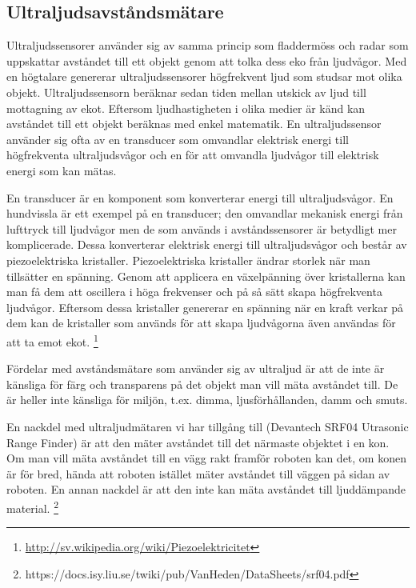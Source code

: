 \documentclass[a4paper,12pt,fleqn]{article}
\begin{document}
\subsection{Ultraljudsavståndsmätare}
Ultraljudssensorer använder sig av samma princip som fladdermöss och radar som uppskattar avståndet till ett objekt genom att tolka dess eko från ljudvågor. Med en högtalare genererar ultraljudssensorer högfrekvent ljud som studsar mot olika objekt. Ultraljudssensorn beräknar sedan tiden mellan utskick av ljud till mottagning av ekot. Eftersom ljudhastigheten i olika medier är känd kan avståndet till ett objekt beräknas med enkel matematik. En ultraljudssensor använder sig ofta av en transducer som omvandlar elektrisk energi till högfrekventa ultraljudsvågor och en för att omvandla ljudvågor till elektrisk energi som kan mätas.

En transducer är en komponent som konverterar energi till ultraljudsvågor. En hundvissla är ett exempel på en transducer; den omvandlar mekanisk energi från lufttryck till ljudvågor men de som används i avståndssensorer är betydligt mer komplicerade. Dessa konverterar elektrisk energi till ultraljudsvågor och består av piezoelektriska kristaller. Piezoelektriska kristaller ändrar storlek när man tillsätter en spänning. Genom att applicera en växelpänning över kristallerna kan man få dem att oscillera i höga frekvenser och på så sätt skapa högfrekventa ljudvågor. Eftersom dessa kristaller genererar en spänning när en kraft verkar på dem kan de kristaller som används för att skapa ljudvågorna även användas för att ta emot ekot.
\footnote{\url{http://sv.wikipedia.org/wiki/Piezoelektricitet}}

Fördelar med avståndsmätare som använder sig av ultraljud är att de inte är känsliga för färg och transparens på det objekt man vill mäta avståndet till. De är heller inte känsliga för miljön, t.ex. dimma, ljusförhållanden, damm och smuts.

En nackdel med ultraljudmätaren vi har tillgång till (Devantech SRF04 Utrasonic Range Finder) är att den mäter avståndet till det närmaste objektet i en kon. Om man vill mäta avståndet till en vägg rakt framför roboten kan det, om konen är för bred, hända att roboten istället mäter avståndet till väggen på sidan av roboten. En annan nackdel är att den inte kan mäta avståndet till ljuddämpande material.
\footnote{https://docs.isy.liu.se/twiki/pub/VanHeden/DataSheets/srf04.pdf}
\end{document}
